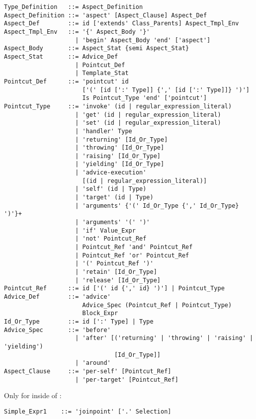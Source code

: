 \syntax\begin{lstlisting}
Type_Definition   ::= Aspect_Definition
Aspect_Definition ::= 'aspect' [Aspect_Clause] Aspect_Def
Aspect_Def        ::= id ['extends' Class_Parents] Aspect_Tmpl_Env
Aspect_Tmpl_Env   ::= '{' Aspect_Body '}'
                    | 'begin' Aspect_Body 'end' ['aspect']
Aspect_Body       ::= Aspect_Stat {semi Aspect_Stat}
Aspect_Stat       ::= Advice_Def
                    | Pointcut_Def
                    | Template_Stat
Pointcut_Def      ::= 'pointcut' id
                      ['(' [id [':' Type]] {',' [id [':' Type]]} ')']
                      Is Pointcut_Type 'end' ['pointcut']
Pointcut_Type     ::= 'invoke' (id | regular_expression_literal)
                    | 'get' (id | regular_expression_literal)
                    | 'set' (id | regular_expression_literal)
                    | 'handler' Type
                    | 'returning' [Id_Or_Type]
                    | 'throwing' [Id_Or_Type]
                    | 'raising' [Id_Or_Type]
                    | 'yielding' [Id_Or_Type]
                    | 'advice-execution' 
                      [(id | regular_expression_literal)]
                    | 'self' (id | Type)
                    | 'target' (id | Type)
                    | 'arguments' {'(' Id_Or_Type {',' Id_Or_Type} ')'}+
                    | 'arguments' '(' ')'
                    | 'if' Value_Expr
                    | 'not' Pointcut_Ref
                    | Pointcut_Ref 'and' Pointcut_Ref
                    | Pointcut_Ref 'or' Pointcut_Ref
                    | '(' Pointcut_Ref ')'
                    | 'retain' [Id_Or_Type]
                    | 'release' [Id_Or_Type]
Pointcut_Ref      ::= id ['(' id {',' id} ')'] | Pointcut_Type
Advice_Def        ::= 'advice' 
                      Advice_Spec (Pointcut_Ref | Pointcut_Type)
                      Block_Expr
Id_Or_Type        ::= id [':' Type] | Type
Advice_Spec       ::= 'before' 
                    | 'after' [('returning' | 'throwing' | 'raising' | 'yielding') 
                               [Id_Or_Type]]
                    | 'around'
Aspect_Clause     ::= 'per-self' [Pointcut_Ref] 
                    | 'per-target' [Pointcut_Ref] 
\end{lstlisting}

Only for  inside of :
\begin{lstlisting}
Simple_Expr1    ::= 'joinpoint' ['.' Selection]
\end{lstlisting}








